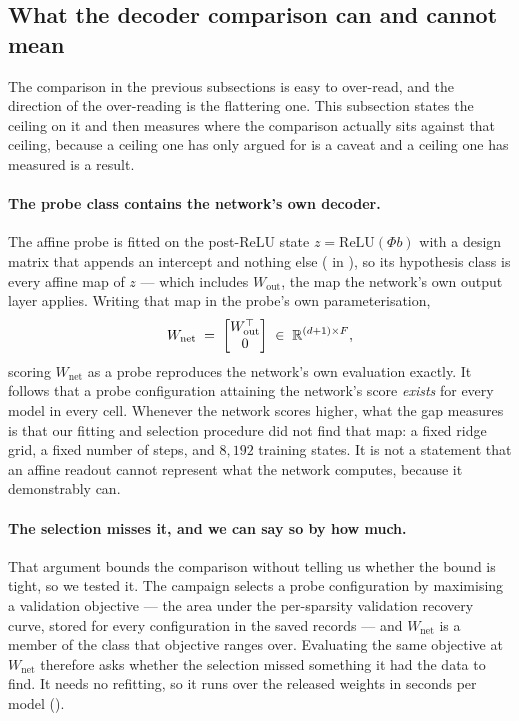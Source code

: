 \subsection{What the decoder comparison can and cannot mean}
\label{sec:probes}

The comparison in the previous subsections is easy to over-read, and the direction of the
over-reading is the flattering one. This subsection states the ceiling on it and then measures
where the comparison actually sits against that ceiling, because a ceiling one has only argued for
is a caveat and a ceiling one has measured is a result.

\paragraph{The probe class contains the network's own decoder.} The affine probe is fitted on the
post-ReLU state $z=\mathrm{ReLU}(\Phi b)$ with a design matrix that appends an intercept and nothing
else ( in ), so its hypothesis class is every affine map of
$z$ --- which includes $W_{\mathrm{out}}$, the map the network's own output layer applies. Writing
that map in the probe's own parameterisation,
\[
  W_{\mathrm{net}} \;=\; \begin{bmatrix} W_{\mathrm{out}}^{\top} \\ 0 \end{bmatrix}
  \;\in\;\mathbb{R}^{(d+1)\times F},
\]
scoring $W_{\mathrm{net}}$ as a probe reproduces the network's own evaluation exactly. It follows
that a probe configuration attaining the network's score \emph{exists} for every model in every
cell. Whenever the network scores higher, what the gap measures is that our fitting and selection
procedure did not find that map: a fixed ridge grid, a fixed number of steps, and $8{,}192$ training
states. It is not a statement that an affine readout cannot represent what the network computes,
because it demonstrably can.

\paragraph{The selection misses it, and we can say so by how much.} That argument bounds the
comparison without telling us whether the bound is tight, so we tested it. The campaign selects a
probe configuration by maximising a validation objective --- the area under the per-sparsity
validation recovery curve, stored for every configuration in the saved records --- and $W_{\mathrm{net}}$
is a member of the class that objective ranges over. Evaluating the same objective at
$W_{\mathrm{net}}$ therefore asks whether the selection missed something it had the data to find. It
needs no refitting, so it runs over the released weights in seconds per model
().

